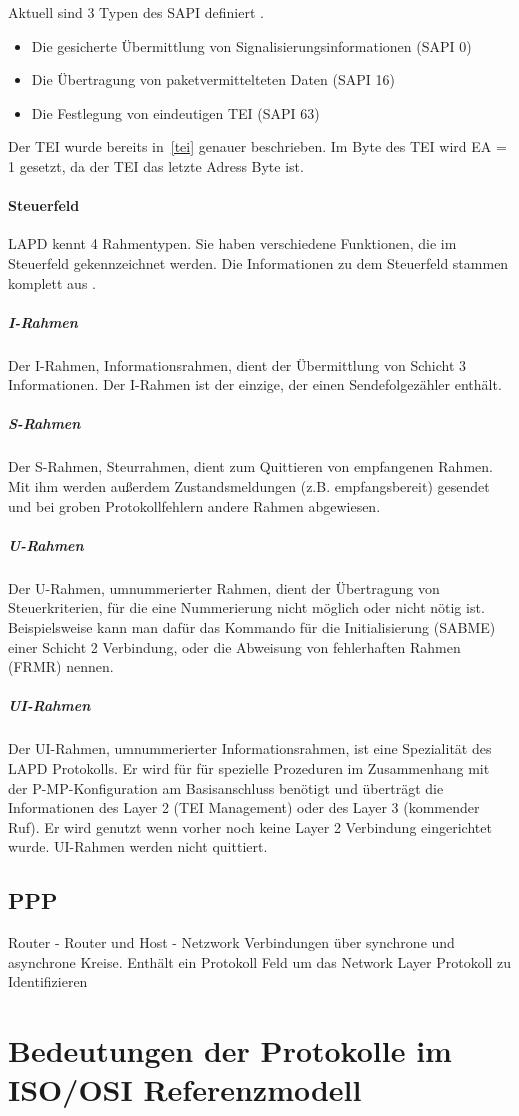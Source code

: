\documentclass[12pt, a4paper, ngerman]{article}
\newcommand{\osi}{ISO/OSI Referenzmodell\xspace}
\begin{document}
Aktuell sind 3 Typen des SAPI definiert \cite{SWB-098672061}. 
\begin{itemize}
	\item Die gesicherte Übermittlung von Signalisierungsinformationen (SAPI 0)
	\item Die Übertragung von paketvermittelteten Daten (SAPI 16)
	\item Die Festlegung von eindeutigen TEI (SAPI 63)
\end{itemize}



Der TEI wurde bereits in~\ref{tei} genauer beschrieben. Im Byte des TEI wird EA = 1 gesetzt, da der TEI das letzte Adress Byte ist.

\paragraph{Steuerfeld}
LAPD kennt 4 Rahmentypen. Sie haben verschiedene Funktionen, die im Steuerfeld gekennzeichnet werden. Die Informationen zu dem Steuerfeld stammen komplett aus \cite{SWB-098672061}.

\subparagraph{I-Rahmen}
Der I-Rahmen, Informationsrahmen, dient der Übermittlung von Schicht 3 Informationen. Der I-Rahmen ist der einzige, der einen Sendefolgezähler enthält.

\subparagraph{S-Rahmen}
Der S-Rahmen, Steurrahmen, dient zum Quittieren von empfangenen Rahmen. Mit ihm werden außerdem Zustandsmeldungen (z.B. empfangsbereit) gesendet und bei groben Protokollfehlern andere Rahmen abgewiesen.

\subparagraph{U-Rahmen}
Der U-Rahmen, umnummerierter Rahmen, dient der Übertragung von Steuerkriterien, für die eine Nummerierung nicht möglich oder nicht nötig ist. Beispielsweise kann man dafür das Kommando für die Initialisierung (SABME) einer Schicht 2 Verbindung, oder die Abweisung von fehlerhaften Rahmen (FRMR) nennen.

\subparagraph{UI-Rahmen}
Der UI-Rahmen, umnummerierter Informationsrahmen, ist eine Spezialität des LAPD Protokolls. Er wird für für spezielle Prozeduren im Zusammenhang mit der P-MP-Konfiguration am Basisanschluss benötigt und überträgt die Informationen des Layer 2 (TEI Management) oder des Layer 3 (kommender Ruf). Er wird genutzt wenn vorher noch keine Layer 2 Verbindung eingerichtet wurde. UI-Rahmen werden nicht quittiert.

\subsection{PPP}
Router - Router und Host - Netzwork Verbindungen über synchrone und asynchrone Kreise. Enthält ein Protokoll Feld um das Network Layer Protokoll zu Identifizieren \cite[S. 102]{SWB-107223570}  

\section{Bedeutungen der Protokolle im \osi }

\nocite{*} 

\newpage
\sloppy
\printbibliography 



\newpage
\listoffigures
\end{document}
